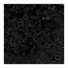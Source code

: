 \documentclass[usenames,dvipsnames,10pt]{beamer}
\begin{document}
\begin{frame}
\begin{minipage}[]{0.3\textwidth}
	\includegraphics[width=\textwidth]{graphics/tfcn-output-08.jpg}
\end{minipage}
\end{frame}
\end{document}
